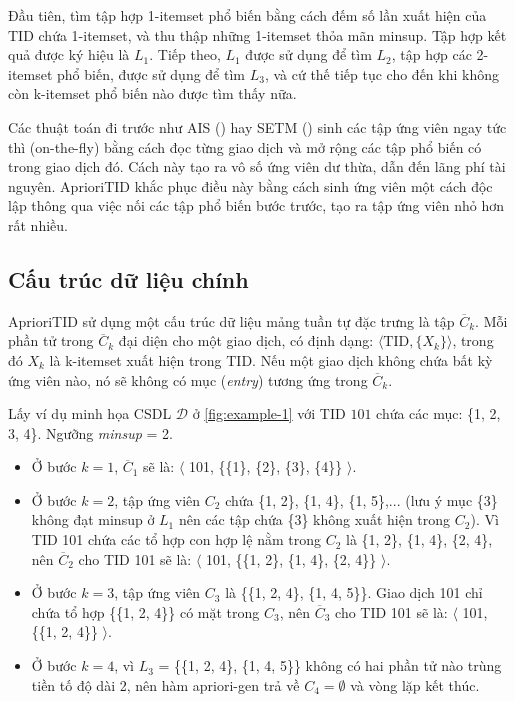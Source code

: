 Đầu tiên, tìm tập hợp 1-itemset phổ biến bằng cách đếm số lần xuất hiện của TID chứa 1-itemset, và thu thập những 1-itemset thỏa mãn minsup. Tập hợp kết quả được ký hiệu là $L_1$. Tiếp theo, $L_1$ được sử dụng để tìm $L_2$, tập hợp các 2-itemset phổ biến, được sử dụng để tìm $L_3$, và cứ thế tiếp tục cho đến khi không còn k-itemset phổ biến nào được tìm thấy nữa.

Các thuật toán đi trước như AIS (\cite{AgrawalImielinskiSwami1993}) hay SETM (\cite{HoutsmaSwami1995SETM}) sinh các tập ứng viên ngay tức thì (on-the-fly) bằng cách đọc từng giao dịch và mở rộng các tập phổ biến có trong giao dịch đó. Cách này tạo ra vô số ứng viên dư thừa, dẫn đến lãng phí tài nguyên. AprioriTID khắc phục điều này bằng cách sinh ứng viên một cách độc lập thông qua việc nối các tập phổ biến bước trước, tạo ra tập ứng viên nhỏ hơn rất nhiều.


\subsection{Cấu trúc dữ liệu chính}
AprioriTID sử dụng một cấu trúc dữ liệu mảng tuần tự đặc trưng là tập $\overline{C}_k$.  Mỗi phần tử trong $\overline{C}_k$ đại diện cho một giao dịch, có định dạng: {$\langle \text{TID},\{X_k\}\rangle$}, trong đó $X_k$ là k-itemset xuất hiện trong TID. Nếu một giao dịch không chứa bất kỳ ứng viên nào, nó sẽ không có mục (\textit{entry}) tương ứng trong $\overline{C}_k$.

Lấy ví dụ minh họa CSDL $\mathcal{D}$ ở \autoref{fig:example-1} với TID $101$ chứa các mục: \{1, 2, 3, 4\}. Ngưỡng \textit{minsup} = 2.

\begin{itemize}
    \item Ở bước $k=1$, $\overline{C}_1$ sẽ là: $\langle$ 101, \{\{1\}, \{2\}, \{3\}, \{4\}\} $\rangle$.
    \item Ở bước $k=2$, tập ứng viên $C_2$ chứa \{1, 2\}, \{1, 4\}, \{1, 5\},... (lưu ý mục \{3\} không đạt minsup ở $L_1$ nên các tập chứa \{3\} không xuất hiện trong $C_2$). Vì TID 101 chứa các tổ hợp con hợp lệ nằm trong $C_2$ là \{1, 2\}, \{1, 4\}, \{2, 4\}, nên $\overline{C}_2$ cho TID 101 sẽ là: $\langle$ 101, \{\{1, 2\}, \{1, 4\}, \{2, 4\}\} $\rangle$.
    \item Ở bước $k=3$, tập ứng viên $C_3$ là \{\{1, 2, 4\}, \{1, 4, 5\}\}. Giao dịch 101 chỉ chứa tổ hợp \{\{1, 2, 4\}\} có mặt trong $C_3$, nên $\overline{C}_3$ cho TID 101 sẽ là: $\langle$ 101, \{\{1, 2, 4\}\} $\rangle$.
    \item Ở bước $k=4$, vì $L_3$ = \{\{1, 2, 4\}, \{1, 4, 5\}\} không có hai phần tử nào trùng tiền tố độ dài 2, nên hàm apriori-gen trả về $C_4 = \emptyset$ và vòng lặp kết thúc.
\end{itemize}

